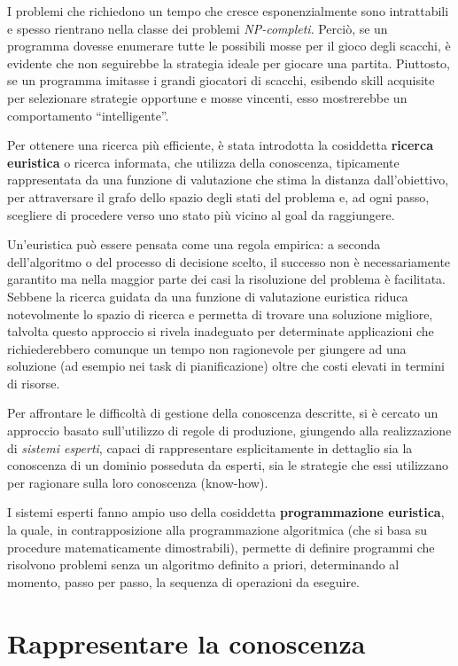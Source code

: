 I problemi che richiedono un tempo che cresce esponenzialmente sono intrattabili e spesso rientrano nella classe dei problemi \emph{NP-completi}. Perciò, se un programma dovesse enumerare tutte le possibili mosse per il gioco degli scacchi, è evidente che non seguirebbe la strategia ideale per giocare una partita. Piuttosto, se un programma imitasse i grandi giocatori di scacchi, esibendo skill acquisite per selezionare strategie opportune e mosse vincenti, esso mostrerebbe un comportamento ``intelligente''.

Per ottenere una ricerca più efficiente, è stata introdotta la cosiddetta \textbf{ricerca euristica} o ricerca informata, che utilizza della conoscenza, tipicamente rappresentata da una funzione di valutazione che stima la distanza dall'obiettivo, per attraversare il grafo dello spazio degli stati del problema e, ad ogni passo, scegliere di procedere verso uno stato più vicino al goal da raggiungere.

Un'euristica può essere pensata come una regola empirica: a seconda dell'algoritmo o del processo di decisione scelto, il successo non è necessariamente garantito ma nella maggior parte dei casi la risoluzione del problema è facilitata. Sebbene la ricerca guidata da una funzione di valutazione euristica riduca notevolmente lo spazio di ricerca e permetta di trovare una soluzione migliore, talvolta questo approccio si rivela inadeguato per determinate applicazioni che richiederebbero comunque un tempo non ragionevole per giungere ad una soluzione (ad esempio nei task di pianificazione) oltre che costi elevati in termini di risorse.

Per affrontare le difficoltà di gestione della conoscenza descritte, si è cercato un approccio basato sull'utilizzo di regole di produzione, giungendo alla realizzazione di \emph{sistemi esperti}, capaci di rappresentare esplicitamente in dettaglio sia la conoscenza di un dominio posseduta da esperti, sia le strategie che essi utilizzano per ragionare sulla loro conoscenza (know-how).

I sistemi esperti fanno ampio uso della cosiddetta \textbf{programmazione euristica}, la quale, in contrapposizione alla programmazione algoritmica (che si basa su procedure matematicamente dimostrabili), permette di definire programmi che risolvono problemi senza un algoritmo definito a priori, determinando al momento, passo per passo, la sequenza di operazioni da eseguire.
 
\section{Rappresentare la conoscenza}

